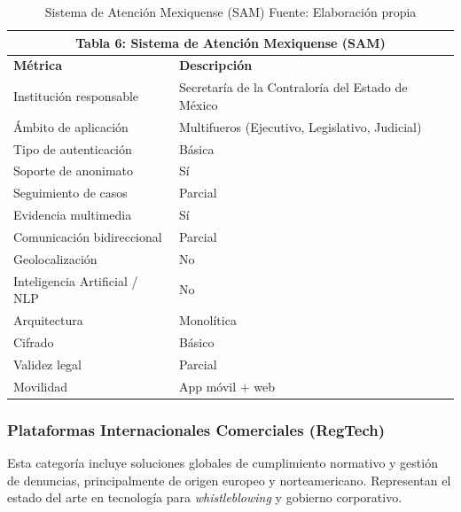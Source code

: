 \begin{table}[htbp]
\centering
\small
\begin{tabular}{|l|l|}
\hline \multicolumn{2}{|c|}{\textbf{Tabla 6: Sistema de Atención Mexiquense (SAM)}} \\
\hline \textbf{Métrica} & \textbf{Descripción} \\
\hline Institución responsable & Secretaría de la Contraloría del Estado de México \\
\hline Ámbito de aplicación & Multifueros (Ejecutivo, Legislativo, Judicial) \\
\hline Tipo de autenticación & Básica \\
\hline Soporte de anonimato & Sí \\
\hline Seguimiento de casos & Parcial \\
\hline Evidencia multimedia & Sí \\
\hline Comunicación bidireccional & Parcial \\
\hline Geolocalización & No \\
\hline Inteligencia Artificial / NLP & No \\
\hline Arquitectura & Monolítica \\
\hline Cifrado & Básico \\
\hline Validez legal & Parcial \\
\hline Movilidad & App móvil + web \\
\hline \end{tabular}
\caption{Sistema de Atención Mexiquense (SAM) \label{tab:sam} \footnotesize Fuente: Elaboración propia \cite{14}}
\end{table}





\subsubsection{Plataformas Internacionales Comerciales (RegTech)}

\begin{flushleft}
\justifying
Esta categoría incluye soluciones globales de cumplimiento normativo y gestión de denuncias, principalmente de origen europeo y norteamericano. Representan el estado del arte en tecnología para \textit{whistleblowing} y gobierno corporativo.
\end{flushleft}

